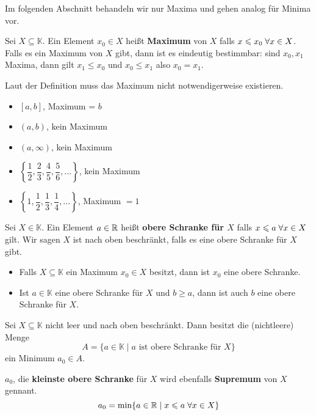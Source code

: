 \documentclass[main.tex]{subfiles}
\begin{document}
Im folgenden Abschnitt behandeln wir nur Maxima und gehen analog für Minima vor.

\begin{Definition}[Maximum]
  Sei $X \subseteq \mathbb{K}$. Ein Element $x_0 \in X$ heißt \textbf{Maximum} von $X$ falls $x\leqslant x_0 \;\forall x \in X$.\\
  Falls es ein Maximum von $X$ gibt, dann ist es eindeutig bestimmbar: sind $x_0, x_1$ Maxima, dann gilt $x_1 \leq x_0$ und $x_0 \leq x_1$ also $x_0 = x_1$.
\end{Definition}

\begin{Bemerkung}
  Laut der Definition muss das Maximum nicht notwendigerweise existieren.
\end{Bemerkung}

\begin{Beispiel}[$a < b$]
  \begin{itemize}
    \item $[a,b]$, Maximum = $b$
    \item $(a,b)$, kein Maximum
    \item $(a,\infty)$, kein Maximum
    \item $\left\{\dfrac{1}{2},\dfrac{2}{3},\dfrac{4}{5},\dfrac{5}{6},...\right\}$, kein Maximum
    \item  $\left\{1,\dfrac{1}{2},\dfrac{1}{3},\dfrac{1}{4},...\right\}$, Maximum $= 1$
  \end{itemize}
\end{Beispiel}

\begin{Definition}
  Sei $X\in \mathbb{K}$. Ein Element $a \in \mathbb{R}$ heißt \textbf{obere Schranke für $X$} falls $x\leqslant a \;\forall x \in X$ gilt. Wir sagen $X$ ist nach oben beschränkt, falls es eine obere Schranke für $X$ gibt.
\end{Definition}

\begin{Theorem}
  \begin{itemize}
    \item Falls $X \subseteq \mathbb{K}$ ein Maximum $x_0 \in X$ besitzt, dann ist $x_0$ eine obere Schranke.
    \item Ist $a \in \mathbb{K}$ eine obere Schranke für $X$ und $b \geq a$, dann ist auch $b$ eine obere Schranke für $X$.
  \end{itemize}
\end{Theorem}

\begin{Theorem}
  Sei $X \subseteq \mathbb{K}$ nicht leer und nach oben beschränkt. Dann besitzt die (nichtleere) Menge
  $$A = \{ a\in \mathbb{K} \mid a \text{ ist obere Schranke für } X\}$$
  ein Minimum $a_0 \in A$.
  \begin{Definition}[Supremum]
    $a_0$, die \textbf{kleinste obere Schranke} für $X$ wird ebenfalls \textbf{Supremum} von $X$ gennant.
    $$a_0 = \min \{a \in \mathbb{R} \mid x \leqslant a \;\forall x \in X\}$$
  \end{Definition}
\end{Theorem}
\end{document}
